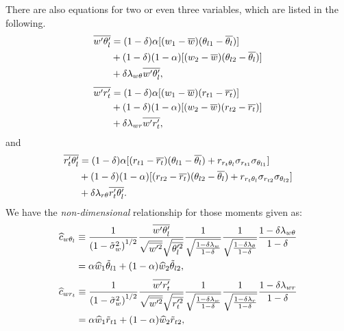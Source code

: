 There are also equations for two or even three variables, which are listed in the following.
\begin{align}
    \label{eq:w_prime_theta_l_prime_bar}
    \overline{w' \theta_l'}
    &= (1 - \delta) \alpha [(w_1 - \overline{w}) (\theta_{l1} - \overline{\theta_l})] \nonumber\\
    &+ (1 - \delta) (1 - \alpha) [(w_2 - \overline{w}) (\theta_{l2} - \overline{\theta_l})] \nonumber\\
    &+ \delta \lambda_{w\theta} \overline{w' \theta_l'},
\end{align}
\begin{align}
    \label{eq:w_prime_r_t_prime_bar}
    \overline{w' r_t'}
    &= (1 - \delta) \alpha [(w_1 - \overline{w}) (r_{t1} - \overline{r_t})] \nonumber\\
    &+ (1 - \delta) (1 - \alpha) [(w_2 - \overline{w}) (r_{t2} - \overline{r_t})] \nonumber\\
    &+ \delta \lambda_{wr} \overline{w' r_t'},
\end{align}
and
\begin{align}
    \label{eq:r_t_prime_theta_l_prime_bar}
    \overline{r_t' \theta_l'}
    &= (1 - \delta) \alpha [(r_{t1} - \overline{r_t}) (\theta_{l1} - \overline{\theta_l}) + r_{r_t \theta_l} \sigma_{r_{t1}} \sigma_{\theta_{l1}}] \nonumber\\
    &+ (1 - \delta) (1 - \alpha) [(r_{t2} - \overline{r_t}) (\theta_{l2} - \overline{\theta_l}) + r_{r_t \theta_l} \sigma_{r_{t2}} \sigma_{\theta_{l2}}] \nonumber\\
    &+ \delta \lambda_{r\theta} \overline{r_t' \theta_l'}.
\end{align}
We have the \emph{non-dimensional} relationship for those moments given as:
\begin{align}
    \widehat{c}_{w \theta_l}
    &\equiv \frac{1}{\left( 1 - \tilde{\sigma}_w^2 \right)^{1/2}} \frac{\overline{w' \theta_l'}}{\sqrt{\overline{w'^2}}\sqrt{\overline{\theta_l'^2}}} \frac{1}{\sqrt{\frac{1 - \delta \lambda_w}{1 - \delta}}}\frac{1}{\sqrt{\frac{1 - \delta \lambda_\theta}{1 - \delta}}} \frac{1 - \delta \lambda_{w\theta}}{1 - \delta} \nonumber\\
    &= \alpha \widehat{w}_1 \tilde{\theta}_{l1} + (1 - \alpha) \widehat{w}_2 \tilde{\theta}_{l2},
    \label{eq:c_hat_w_theta_l_nondim}
\end{align}
\begin{align}
    \widehat{c}_{w r_t}
    &\equiv \frac{1}{\left( 1 - \tilde{\sigma}_w^2 \right)^{1/2}} \frac{\overline{w' r_t'}}{\sqrt{\overline{w'^2}}\sqrt{\overline{r_t'^2}}} \frac{1}{\sqrt{\frac{1 - \delta \lambda_w}{1 - \delta}}} \frac{1}{\sqrt{\frac{1 - \delta \lambda_r}{1-\delta}}} \frac{1 - \delta \lambda_{w r}}{1-\delta} \nonumber\\
    &= \alpha \widehat{w}_1 \tilde{r}_{t1} + (1 - \alpha) \widehat{w}_2 \tilde{r}_{t2},
    \label{eq:c_hat_w_r_t_nondim}
\end{align}
